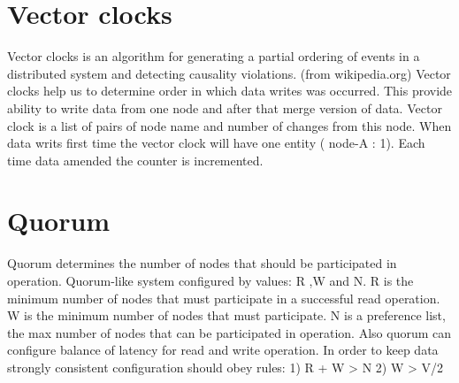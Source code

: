 \section*{Vector clocks}

Vector clocks is an algorithm for generating a partial ordering of events in a distributed system and detecting causality violations. (from wikipedia.org)
Vector clocks help us to determine order in which data writes was occurred. This provide ability to write data from one node and after that 
merge version of data. Vector clock is a list of pairs of node name and number of changes from this node.
When data writs first time the vector clock will have one entity ( node-A : 1). Each time data amended the counter is incremented.

\section*{Quorum}

Quorum determines the number of nodes that should be participated in operation.  Quorum-like system configured by values: R ,W and N. R is the
minimum number of nodes that must participate in a successful read operation. W is the minimum number of nodes that must participate.
N is a preference list, the max number of nodes that can be participated in operation. Also quorum can configure balance of latency
for read and write operation.
 In order to keep data strongly consistent configuration should obey rules:
 1) R + W > N
 2) W > V/2


